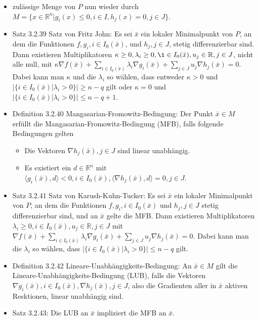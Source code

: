 \documentclass[paper=a4, fontsize=11pt]{scrartcl} %
\numberwithin{equation}{section} %
\numberwithin{figure}{section} %
\numberwithin{table}{section} %
\begin{document}
\begin{itemize}
  \item zulässige Menge von $P$ nun wieder durch $M = \{ x \in \mathbb{R}^n | g_i(x) \le 0, i \in I, h_j(x) = 0, j \in J\}$.
  \item Satz 3.2.39 Satz von Fritz John: Es sei $\bar{x}$ ein lokaler Minimalpunkt von $P$, an dem die Funktionen $f, g_i, i \in I_0(\bar{x})$, und $h_j,j\in J$, stetig differenzierbar sind. Dann existieren Multiplikatoren $\kappa \ge 0, \lambda_i \ge 0, \i \in I_0(\bar{x}), u_j \in \mathbb{R}, j\in J$, nicht alle null, mit $\kappa \nabla f(\bar{x}) + \sum\limits_{i \in I_0(\bar{x})} \lambda_i \nabla g_i(\bar{x}) + \sum\limits_{j \in J} u_j \nabla h_j(\bar{x}) = 0$. Dabei kann man $\kappa$ und die $\lambda_i$ so wählen, dass entweder $\kappa > 0$ und $|\{i\in I_0(\bar{x}) | \lambda_i > 0 \}| \ge n-q$ gilt oder $\kappa = 0$ und $|\{i \in I_0(\bar{x}) | \lambda_i > 0 \}| \le n-q+1$.
  \item Definition 3.2.40 Mangasarian-Fromowitz-Bedingung: Der Punkt $\bar{x} \in M$ erfüllt die Mangasarian-Fromowitz-Bedingung (MFB), falls folgende Bedingungen gelten
  \begin{itemize}
    \item Die Vektoren $\nabla h_j(\bar{x}), j \in J$ sind linear unabhängig.
    \item Es existiert ein $d \in \mathbb{R}^n$ mit $\langle g_i(\bar{x}),d \rangle < 0, i \in I_0(\bar{x}), \langle \nabla h_j(\bar{x}),d \rangle = 0, j \in J$.
  \end{itemize}
  \item Satz 3.2.41 Satz von Karush-Kuhn-Tucker: Es sei $\bar{x}$ ein lokaler Minimalpunkt von $P$, an dem die Funktionen $f, g_i, i \in I_0(\bar{x})$ und $h_j, j \in J$ stetig differenzierbar sind, und an $\bar{x}$ gelte die MFB. Dann existieren Multiplikatoren $\lambda_i \ge 0, i \in I_0(\bar{x}), u_j \in \mathbb{R}, j \in J$ mit $\nabla f(\bar{x}) + \sum\limits_{i \in I_0(\bar{x})} \lambda_i \nabla g_i(\bar{x}) + \sum\limits_{j \in J} u_j \nabla h_j(\bar{x}) = 0$. Dabei kann man die $\lambda_i$ so wählen, dass $|\{ i \in I_0(\bar{x}) | \lambda_i > 0 \}| \le n-q$ gilt.
  \item Definition 3.2.42 Lineare-Unabhängigkeits-Bedingung: An $\bar{x} \in M$ gilt die Lineare-Unabhängigkeits-Bedingung (LUB), falls die Vektoren $\nabla g_i(\bar{x}), i \in I_0(\bar{x}), \nabla h_j(\bar{x}), j \in J$, also die Gradienten aller in $\bar{x}$ aktiven Resktionen, linear unabhängig sind.
  \item Satz 3.2.43: Die LUB an $\bar{x}$ impliziert die MFB an $\bar{x}$.
\end{itemize}
\end{document}
